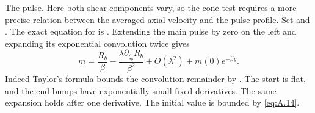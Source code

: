 The pulse. Here both shear components vary, so the cone test requires a more precise relation
between the averaged axial velocity and the pulse profile. Set
 and . The
exact equation for  is .
Extending the main pulse by zero on the left and expanding its exponential convolution twice
gives
\begin{equation}
 m=\frac{R_b}{\beta}-\frac{\lambda\partial_{\zeta_b}R_b}{\beta^2}
   +O(\lambda^2)+m(0)e^{-\beta y}.
 \tag{A.28}\label{eq:A.28}
\end{equation}
%
Indeed Taylor's formula bounds the convolution remainder by
. The start is flat, and the end bumps have exponentially
small fixed  derivatives. The same expansion holds after one
 derivative. The initial value is bounded by \eqref{eq:A.14}.

